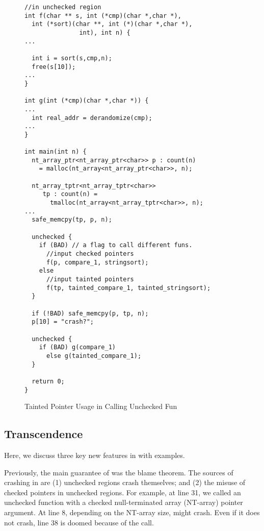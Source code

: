 \begin{figure}[t]
{\small
  \begin{lstlisting}[xleftmargin=4 mm]
//in unchecked region
int f(char ** s, int (*cmp)(char *,char *),
  int (*sort)(char **, int (*)(char *,char *),
               int), int n) {
...

  int i = sort(s,cmp,n);
  free(s[10]);
...
}

int g(int (*cmp)(char *,char *)) {
...
  int real_addr = derandomize(cmp);
...
}

int main(int n) {
  nt_array_ptr<nt_array_ptr<char>> p : count(n)
    = malloc(nt_array<nt_array_ptr<char>>, n);

  nt_array_tptr<nt_array_tptr<char>>
     tp : count(n) =
       tmalloc(nt_array<nt_array_tptr<char>>, n);
...
  safe_memcpy(tp, p, n);

  unchecked {
    if (BAD) // a flag to call different funs.
      //input checked pointers
      f(p, compare_1, stringsort); 
    else 
      //input tainted pointers
      f(tp, tainted_compare_1, tainted_stringsort);
  }

  if (!BAD) safe_memcpy(p, tp, n);
  p[10] = "crash?";
  
  unchecked {
    if (BAD) g(compare_1)
      else g(tainted_compare_1);
  }

  return 0;
}
  \end{lstlisting}
}
\caption{Tainted Pointer Usage in Calling Unchecked Fun}
\label{fig:checkedc-example-3}
\end{figure}

\subsection{\systemname Transcendence}

Here, we discuss three key new features in \systemname with examples.

Previously, the main guarantee of \checkedc \cite{li22checkedc} was the blame theorem.
The sources of crashing in \checkedc are (1) unchecked regions crash themselves;
  and (2) the misuse of checked pointers in unchecked regions.
For example, at  line 31,
we called an unchecked function  with a checked null-terminated array (NT-array) pointer argument.
At line 8, depending on the NT-array size,  might crash.
Even if it does not crash, line 38 is doomed because of the  call.

